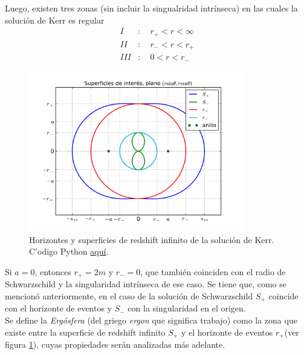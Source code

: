 Luego, existen tres zonas (sin incluir la singualridad intr\'inseca) en las cuales la soluci\'on de Kerr es regular
\begin{equation}
\begin{aligned}
I&:\quad r_+<r<\infty\\
II&:\quad r_{-}<r<r_{+}\\
III&:\quad 0<r<r_{-}
\end{aligned}
\end{equation}

\begin{figure}[H]
 \centering
\includegraphics[height=7cm,angle=0]{fig/fig-superficies-2.pdf}
\caption{Horizontes y superficies de redshift infinito de la soluci\'on de Kerr.  C'odigo Python \href{https://github.com/gfrubi/GR/blob/master/figuras-editables/fig-superficies-Kerr-01.py}{aqu\'i}.}
\label{fig:surface2}
\end{figure}

Si $a=0$, entonces $r_{+}=2m$ y $r_{-}=0$, que tambi\'en coinciden con el radio de Schwarzschild y la singularidad intr\'inseca de ese caso. Se tiene que, como se mencion\'o anteriormente, en el caso de la soluci\'on de Schwarzschild $S_{+}$ coincide con el horizonte de eventos y $S_{-}$ con la singularidad en el origen.\\

Se define la \textit{Erg\'osfera} (del griego \textit{ergon} que significa trabajo) como la zona que existe entre la superficie de redshift infinito $S_{+}$ y el horizonte de eventos $r_{+}$(ver figura \ref{fig:surface2}), cuyas propiedades ser\'an analizadas m\'as adelante.\\

